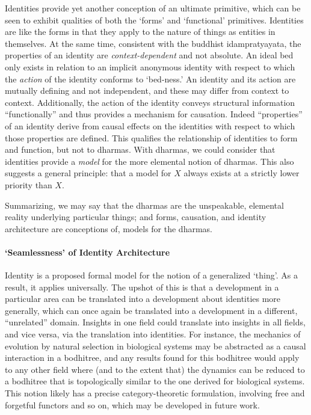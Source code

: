 \documentclass[pra,twocolumn,groupedaddress,10pt]{revtex4}
\theoremstyle{definition}
\begin{document}
Identities provide yet another conception of an ultimate primitive, which can be seen to exhibit qualities of both the `forms' and `functional' primitives. Identities are like the forms in that they apply to the nature of things as entities in themselves. At the same time, consistent with the buddhist idampratyayata, the properties of an identity are \emph{context-dependent} and not absolute. An ideal bed only exists in relation to an implicit anonymous identity with respect to which the \emph{action} of the identity conforms to `bed-ness.' An identity and its action are mutually defining and not independent, and these may differ from context to context. Additionally, the action of the identity conveys structural information ``functionally'' and thus provides a mechanism for causation. Indeed ``properties'' of an identity derive from causal effects on the identities with respect to which those properties are defined. This qualifies the relationship of identities to form and function, but not to dharmas. With dharmas, we could consider that identities provide a \emph{model} for the more elemental notion of dharmas. This also suggests a general principle: that a model for $X$ always exists at a strictly lower priority than $X$.

Summarizing, we may say that the dharmas are the unspeakable, elemental reality underlying particular things; and forms, causation, and identity architecture are conceptions of, models for the dharmas.

\paragraph{`Seamlessness' of Identity Architecture} Identity is a proposed formal model for the notion of a generalized `thing'. As a result, it applies universally. The upshot of this is that a development in a particular area can be translated into a development about identities more generally, which can once again be translated into a development in a different, ``unrelated'' domain. Insights in one field could translate into insights in all fields, and vice versa, via the translation into identities. For instance, the mechanics of evolution by natural selection in biological systems may be abstracted as a causal interaction in a bodhitree, and any results found for this bodhitree would apply to any other field where (and to the extent that) the dynamics can be reduced to a bodhitree that is topologically similar to the one derived for biological systems. This notion likely has a precise category-theoretic formulation, involving free and forgetful functors and so on, which may be developed in future work.
\end{document}

